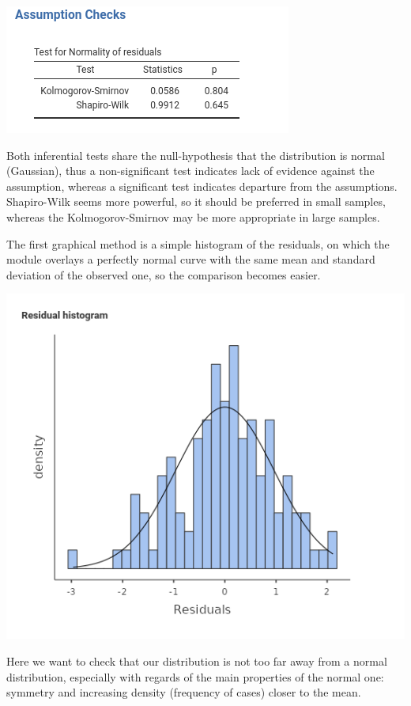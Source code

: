 \documentclass[
]{book}
\begin{document}
\includegraphics{bookletpics/2_assumptions_output3.png}

Both inferential tests share the null-hypothesis that the distribution is normal (Gaussian), thus a non-significant test indicates lack of evidence against the assumption, whereas a significant test indicates departure from the assumptions. Shapiro-Wilk seems more powerful, so it should be preferred in small samples, whereas the Kolmogorov-Smirnov may be more appropriate in large samples.

The first graphical method is a simple histogram of the residuals, on which the module overlays a perfectly normal curve with the same mean and standard deviation of the observed one, so the comparison becomes easier.

\includegraphics{bookletpics/2_assumptions_output4.png}

Here we want to check that our distribution is not too far away from a normal distribution, especially with regards of the main properties of the normal one: symmetry and increasing density (frequency of cases) closer to the mean.
\end{document}
